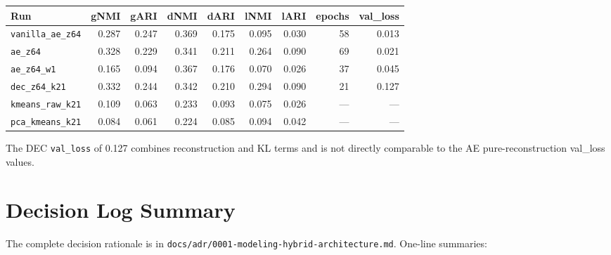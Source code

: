 \documentclass[11pt,a4paper]{article}
\begin{document}
\begin{center}\small
{}
\begin{tabular}{@{}l rrrrrr rr@{}}
\toprule
\textbf{Run} & \textbf{gNMI} & \textbf{gARI} & \textbf{dNMI} & \textbf{dARI} & \textbf{lNMI} & \textbf{lARI} & \textbf{epochs} & \textbf{val\_loss} \\
\midrule
\texttt{vanilla\_ae\_z64} & 0.287 & 0.247 & 0.369 & 0.175 & 0.095 & 0.030 & 58 & 0.013 \\
\texttt{ae\_z64}          & 0.328 & 0.229 & 0.341 & 0.211 & 0.264 & 0.090 & 69 & 0.021 \\
\texttt{ae\_z64\_w1}      & 0.165 & 0.094 & 0.367 & 0.176 & 0.070 & 0.026 & 37 & 0.045 \\
\texttt{dec\_z64\_k21}    & 0.332 & 0.244 & 0.342 & 0.210 & 0.294 & 0.090 & 21 & 0.127 \\
\texttt{kmeans\_raw\_k21} & 0.109 & 0.063 & 0.233 & 0.093 & 0.075 & 0.026 & --- & --- \\
\texttt{pca\_kmeans\_k21} & 0.084 & 0.061 & 0.224 & 0.085 & 0.094 & 0.042 & --- & --- \\
\bottomrule
\end{tabular}
\end{center}

\noindent The DEC \texttt{val\_loss} of 0.127 combines reconstruction and KL terms and is not directly comparable to the AE pure-reconstruction val\_loss values.

\section{Decision Log Summary}
\label{app:decisions}

\noindent The complete decision rationale is in \texttt{docs/adr/0001-modeling-hybrid-architecture.md}. One-line summaries:
\end{document}
